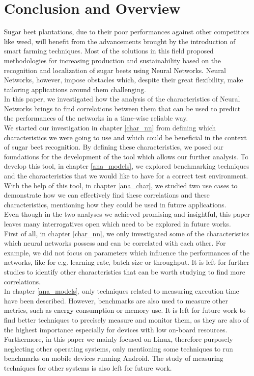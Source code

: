 \chapter{Conclusion and Overview}

Sugar beet plantations, due to their poor performances against other competitors like weed, will benefit from the advancements brought by the introduction of smart farming techniques. Most of the solutions in this field proposed methodologies for increasing production and sustainability based on the recognition and localization of sugar beets using Neural Networks. Neural Networks, however, impose obstacles which, despite their great flexibility, make tailoring applications around them challenging.\\ 
In this paper, we investigated how the analysis of the characteristics of Neural Networks brings to find correlations between them that can be used to predict the performances of the networks in a time-wise reliable way.\\
We started our investigation in chapter \ref{char_nn} from defining which characteristics we were going to use and which could be beneficial in the context of sugar beet recognition. By defining these characteristics, we posed our foundations for the development of the tool which allows our further analysis. To develop this tool, in chapter \ref{ana_models}, we explored benchmarking techniques and the characteristics that we would like to have for a correct test environment. With the help of this tool, in chapter \ref{ana_char},  we studied two use cases to demonstrate how we can effectively find these correlations and these characteristics, mentioning how they could be used in future applications. \\
Even though in the two analyses we achieved promising and insightful, this paper leaves many interrogatives open which need to be explored in future works. \\
First of all, in chapter \ref{char_nn}, we only investigated some of the characteristics which neural networks possess and can be correlated with each other. For example, we did not focus on parameters which influence the performances of the networks, like for e.g. learning rate, batch size or throughput. It is left for further studies to identify other characteristics that can be worth studying to find more correlations.\\
In chapter \ref{ana_models}, only techniques related to measuring execution time have been described. However, benchmarks are also used to measure other metrics, such as energy consumption or memory use. It is left for future work to find better techniques to precisely measure and monitor them, as they are also of the highest importance especially for devices with low on-board resources. Furthermore, in this paper we mainly focused on Linux, therefore purposely neglecting other operating systems, only mentioning some techniques to run benchmarks on mobile devices running Android. The study of measuring techniques for other systems is also left for future work. \\
